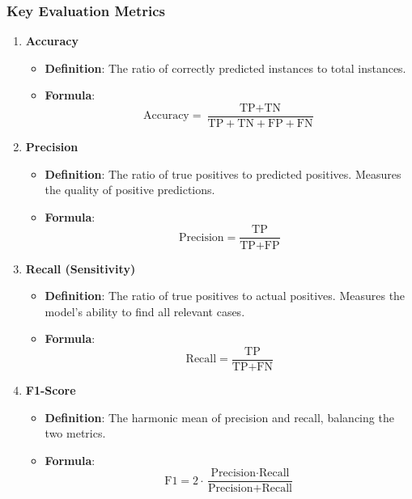 \documentclass{beamer}
\begin{document}
\begin{frame}[fragile]
    \frametitle{Key Evaluation Metrics}
    \begin{enumerate}
        \item \textbf{Accuracy}
        \begin{itemize}
            \item \textbf{Definition}: The ratio of correctly predicted instances to total instances.
            \item \textbf{Formula}: 
            \begin{equation}
                \text{Accuracy} = \frac{\text{TP} + \text{TN}}{\text{TP} + \text{TN} + \text{FP} + \text{FN}}
            \end{equation}
        \end{itemize}
        
        \item \textbf{Precision}
        \begin{itemize}
            \item \textbf{Definition}: The ratio of true positives to predicted positives. Measures the quality of positive predictions.
            \item \textbf{Formula}: 
            \begin{equation}
                \text{Precision} = \frac{\text{TP}}{\text{TP} + \text{FP}}
            \end{equation}
        \end{itemize}

        \item \textbf{Recall (Sensitivity)}
        \begin{itemize}
            \item \textbf{Definition}: The ratio of true positives to actual positives. Measures the model's ability to find all relevant cases.
            \item \textbf{Formula}: 
            \begin{equation}
                \text{Recall} = \frac{\text{TP}}{\text{TP} + \text{FN}}
            \end{equation}
        \end{itemize}

        \item \textbf{F1-Score}
        \begin{itemize}
            \item \textbf{Definition}: The harmonic mean of precision and recall, balancing the two metrics.
            \item \textbf{Formula}: 
            \begin{equation}
                \text{F1} = 2 \cdot \frac{\text{Precision} \cdot \text{Recall}}{\text{Precision} + \text{Recall}}
            \end{equation}
        \end{itemize}
    \end{enumerate}
\end{frame}
\end{document}
